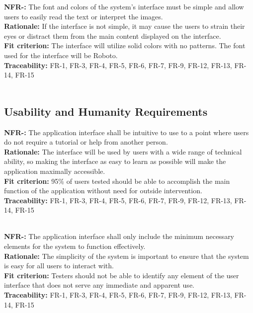 \documentclass[12pt, titlepage]{article}
\newcounter{NFR_Counter}
\newcounter{FR_Counter}
\begin{document}
\noindent\textbf{NFR-\the\value{NFR_Counter}:}
The font and colors of the system's interface must be simple and allow users to easily read the text or interpret the images. \\
\textbf{Rationale:}
If the interface is not simple, it may cause the users to strain their eyes or distract them from the main content displayed on the interface. \\
\textbf{Fit criterion:}
The interface will utilize solid colors with no patterns. The font used for the interface will be Roboto. \\
\textbf{Traceability:}
FR-1, FR-3, FR-4, FR-5, FR-6, FR-7, FR-9, FR-12, FR-13, FR-14, FR-15 \\~\\
\addtocounter{NFR_Counter}{1}

\subsection{Usability and Humanity Requirements}

\textbf{NFR-\the\value{NFR_Counter}:}
The application interface shall be intuitive to use to a point where users do not require a tutorial or help from another person. \\
\textbf{Rationale:}
The interface will be used by users with a wide range of technical ability, so making the interface as easy to learn as possible will make the application maximally accessible. \\
\textbf{Fit criterion:}
95\% of users tested should be able to accomplish the main function of the application without need for outside intervention. \\
\textbf{Traceability:}
FR-1, FR-3, FR-4, FR-5, FR-6, FR-7, FR-9, FR-12, FR-13, FR-14, FR-15 \\~\\
\addtocounter{NFR_Counter}{1}

\noindent\textbf{NFR-\the\value{NFR_Counter}:}
The application interface shall only include the minimum necessary elements for the system to function effectively. \\
\textbf{Rationale:}
The simplicity of the system is important to ensure that the system is easy for all users to interact with. \\
\textbf{Fit criterion:}
Testers should not be able to identify any element of the user interface that does not serve any immediate and apparent use. \\
\textbf{Traceability:}
FR-1, FR-3, FR-4, FR-5, FR-6, FR-7, FR-9, FR-12, FR-13, FR-14, FR-15 \\~\\
\addtocounter{NFR_Counter}{1}
\end{document}
